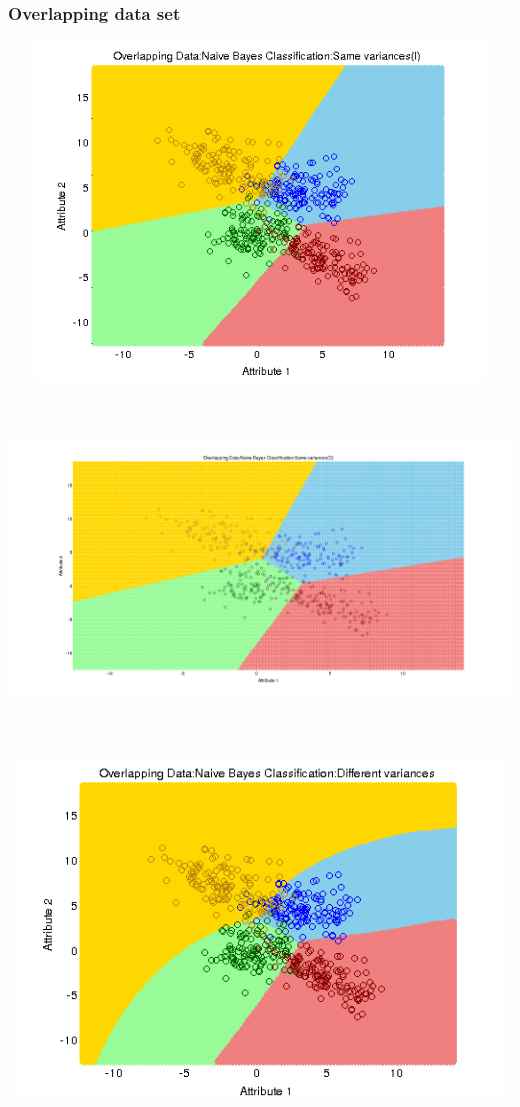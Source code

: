 \documentclass[a4paper]{article}
\begin{document}
	\subsubsection{Overlapping data set}
		\centerline{\includegraphics[width=160mm,height=90mm]{plots/naivebayes/over/identity_var.png}}
		\centerline{\includegraphics[width=160mm,height=90mm]{plots/naivebayes/over/same_var.png}}
		\centerline{\includegraphics[width=160mm,height=90mm]{plots/naivebayes/over/diff_var.png}}
\end{document}
